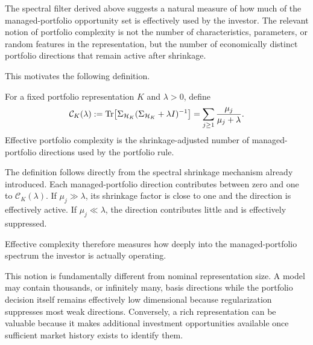 The spectral filter derived above suggests a natural measure of how much of the
managed-portfolio opportunity set is effectively used by the investor. The
relevant notion of portfolio complexity is not the number of characteristics,
parameters, or random features in the representation, but the number of
economically distinct portfolio directions that remain active after shrinkage.

This motivates the following definition.

\begin{definition}
\label{def:effective_complexity}
For a fixed portfolio representation $K$ and $\lambda>0$, define
\begin{equation}
\mathcal C_K(\lambda)
:=
\operatorname{Tr}\!\left[
\Sigma_{\mathcal{H}_K}
(\Sigma_{\mathcal{H}_K}+\lambda I)^{-1}
\right]
=
\sum_{j\geq1}
\frac{\mu_j}{\mu_j+\lambda}.
\label{eq:effective_complexity}
\end{equation}
Effective portfolio complexity is the shrinkage-adjusted number of
managed-portfolio directions used by the portfolio rule.
\end{definition}

The definition follows directly from the spectral shrinkage mechanism already
introduced. Each managed-portfolio direction contributes between zero and one
to $\mathcal C_K(\lambda)$. If $\mu_j\gg\lambda$, its shrinkage factor is close
to one and the direction is effectively active. If $\mu_j\ll\lambda$, the
direction contributes little and is effectively suppressed.

Effective complexity therefore measures how deeply into the
managed-portfolio spectrum the investor is actually operating.

This notion is fundamentally different from nominal representation size. A
model may contain thousands, or infinitely many, basis directions while the
portfolio decision itself remains effectively low dimensional because
regularization suppresses most weak directions. Conversely, a rich
representation can be valuable because it makes additional investment
opportunities available once sufficient market history exists to identify them.

